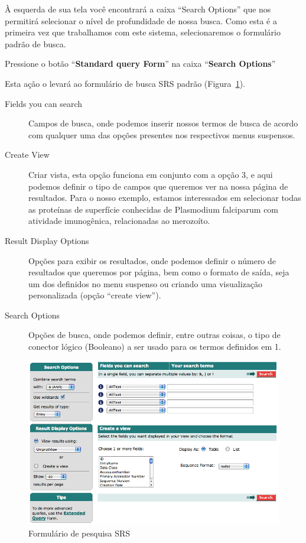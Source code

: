 \documentclass[letter,11pt]{book}
\begin{document}
À esquerda de sua tela você encontrará a caixa ``Search Options'' que nos permitirá selecionar o nível de profundidade de nossa busca. Como esta é a primeira vez que trabalhamos com este sistema, selecionaremos o formulário padrão de busca. 

Pressione o botão ``\textbf{Standard query Form}'' na caixa ``\textbf{Search Options}'' 

Esta ação o levará ao formulário de busca SRS padrão (Figura~\ref{searchform}).

\begin{description}
\item[Fields you can search] Campos de busca, onde podemos inserir nossos termos de busca de acordo com qualquer uma das opções presentes nos respectivos menus suspensos. 
\item[Create View] Criar vista, esta opção funciona em conjunto com a opção 3, e aqui podemos definir o tipo de campos que queremos ver na nossa página de resultados. Para o nosso exemplo, estamos interessados em selecionar todas as proteínas de superfície conhecidas de Plasmodium falciparum com atividade imunogênica, relacionadas ao merozoíto. 
\item[Result Display Options] Opções para exibir os resultados, onde podemos definir o número de resultados que queremos por página, bem como o formato de saída, seja um dos definidos no menu suspenso ou criando uma visualização personalizada (opção ``create view'').
\item[Search Options] Opções de busca, onde podemos definir, entre outras coisas, o tipo de conector lógico (Booleano) a ser usado para os termos definidos em 1. 
\end{description}


\begin{figure}[ht]
\centering
   \includegraphics[width=12cm]{Figs/SearchFormSRS.png}
  \caption{\label{searchform}Formulário de pesquisa SRS}
\end{figure}
\end{document}
